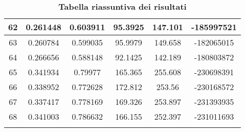 \begin{longtable}{|c|c|c|c|c|c|}
62    & 0.261448  & 0.603911          & 95.3925    & 147.101    & -185997521 \\ \hline
63    & 0.260784  & 0.599035          & 95.9979    & 149.658    & -182065015 \\ \hline
64    & 0.266656  & 0.588148          & 92.1425    & 142.189    & -180803872 \\ \hline
65    & 0.341934  & 0.79977           & 165.365    & 255.608    & -230698391 \\ \hline
66    & 0.338952  & 0.772628          & 172.812    & 253.56     & -230168572 \\ \hline
67    & 0.337417  & 0.778169          & 169.326    & 253.897    & -231393935 \\ \hline
68    & 0.341003  & 0.786632          & 166.155    & 252.397    & -231011693 \\ \hline
\caption{\textbf{Tabella riassuntiva dei risultati}}
\end{longtable}